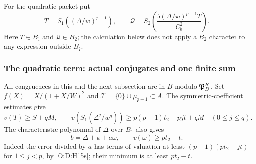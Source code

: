 \documentclass[11pt]{amsart}
\theoremstyle{definition}
\theoremstyle{remark}
\begin{document}
For the quadratic packet put
\begin{equation}\label{O:D:WPdef}
 T=S_1((\Delta/w)^{p-1}),\qquad
 \mathcal Q=S_2\!\left(
 \frac{b(\Delta/w)^{p-1}T}{C_b^2}\right).
\end{equation}
Here $T\in B_1$ and $\mathcal Q\in B_2$; the calculation below does not apply a
$B_2$ character to any expression outside $B_2$.
\subsubsection*{The quadratic term: actual conjugates and one finite sum}
All congruences in this and the next subsection are in $B$ modulo
$\mathfrak P_B^K$. Set $f(X)=X/(1+X/W)^2$ and
$\mathcal T=\{0\}\cup\mu_{p-1}\subset A$.
The symmetric-coefficient estimates give
\begin{equation}\label{O:D:Tbound}
 v(T)\ge S+qM,\qquad
 v\left(S_1(\Delta^j/w^q)\right)\ge
 p(p-1)t_2-pjt+qM\quad(0\le j\le q).
\end{equation}
The characteristic polynomial of $\Delta$ over $B_1$ also gives
\begin{equation}\label{O:D:omega}
 b=\Delta+a+a\omega,\qquad v(\omega)\ge pt_2-t.
\end{equation}
Indeed the error divided by $a$ has terms of valuation at least
$(p-1)(pt_2-jt)$ for $1\le j<p$, by \eqref{O:D:H15s}; their minimum
is at least $pt_2-t$.
\end{document}
